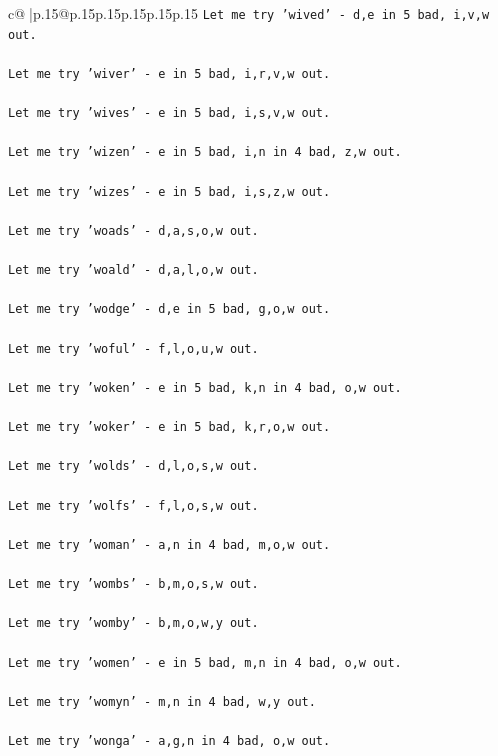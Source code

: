 \documentclass{article}
\begin{document}
{\begin{supertabular}{c@{$\;$}|p{.15\linewidth}@{}p{.15\linewidth}p{.15\linewidth}p{.15\linewidth}p{.15\linewidth}p{.15\linewidth}}
{{{\texttt{Let me try 'wived' {-} d,e in 5 bad, i,v,w out. } \\
\\ 
\texttt{Let me try 'wiver' {-} e in 5 bad, i,r,v,w out. } \\
\\ 
\texttt{Let me try 'wives' {-} e in 5 bad, i,s,v,w out. } \\
\\ 
\texttt{Let me try 'wizen' {-} e in 5 bad, i,n in 4 bad, z,w out. } \\
\\ 
\texttt{Let me try 'wizes' {-} e in 5 bad, i,s,z,w out. } \\
\\ 
\texttt{Let me try 'woads' {-} d,a,s,o,w out. } \\
\\ 
\texttt{Let me try 'woald' {-} d,a,l,o,w out. } \\
\\ 
\texttt{Let me try 'wodge' {-} d,e in 5 bad, g,o,w out. } \\
\\ 
\texttt{Let me try 'woful' {-} f,l,o,u,w out. } \\
\\ 
\texttt{Let me try 'woken' {-} e in 5 bad, k,n in 4 bad, o,w out. } \\
\\ 
\texttt{Let me try 'woker' {-} e in 5 bad, k,r,o,w out. } \\
\\ 
\texttt{Let me try 'wolds' {-} d,l,o,s,w out. } \\
\\ 
\texttt{Let me try 'wolfs' {-} f,l,o,s,w out. } \\
\\ 
\texttt{Let me try 'woman' {-} a,n in 4 bad, m,o,w out. } \\
\\ 
\texttt{Let me try 'wombs' {-} b,m,o,s,w out. } \\
\\ 
\texttt{Let me try 'womby' {-} b,m,o,w,y out. } \\
\\ 
\texttt{Let me try 'women' {-} e in 5 bad, m,n in 4 bad, o,w out. } \\
\\ 
\texttt{Let me try 'womyn' {-} m,n in 4 bad, w,y out. } \\
\\ 
\texttt{Let me try 'wonga' {-} a,g,n in 4 bad, o,w out. } \\
}}}
\end{supertabular}}
\end{document}
